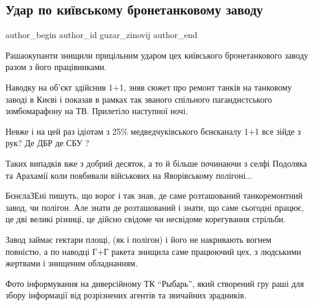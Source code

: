  
 
 
 
 
 
\subsection{Удар по київському бронетанковому заводу}
\label{sec:17_04_2022.fb.guzar_zinovij.1.kiev_bronetankovyj_zavod}
 
\ifcmt
 author_begin
   author_id guzar_zinovij
 author_end
\fi

Рашаокупанти знищили прицільним ударом цех київського бронетанкового заводу
разом з його працівниками. 

Наводку на об'єкт здійснив 1+1, зняв сюжет про ремонт танків на танковому
заводі в Києві і показав в рамках  так званого спільного пагандистського
зомбомарафону на ТВ. Прилетіло наступної ночі.


Невже і на цей раз ідіотам з 25\% медведчуківського  бєнєканалу 1+1 все зійде з
рук? Де ДБР де СБУ ?

Таких випадків вже з добрий десяток, а то й більше починаючи з селфі Подоляка
та Арахамії коли повбивали  військових на Яворівському полігоні...

БєнєлаЗЕні пишуть, що ворог і так знав, де саме розташований танкоремонтний
завод, чи полігон. Але знати де розташований і знати, що саме сьогодні працює,
це дві великі різниці, це дійсно свідоме чи несвідоме корегування стрільби.

Завод займає гектари площі, (як і полігон) і його не накривають вогнем
повністю, а по наводці Г+Г ракета знищила саме працюючий цех, з людськими
жертвами і знищеним обладнанням.

Фото інформування на диверсійному ТК \enquote{Рыбарь}, який  створений гру раші
для збору інформації від розрізнених агентів та звичайних зрадників.

